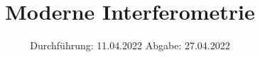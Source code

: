 

\subject{V64}
\title{Moderne Interferometrie}
\date{%
  Durchführung: 11.04.2022
  \hspace{3em}
  Abgabe: 27.04.2022
}



\maketitle
\thispagestyle{empty}
\tableofcontents
\newpage







\printbibliography{}



